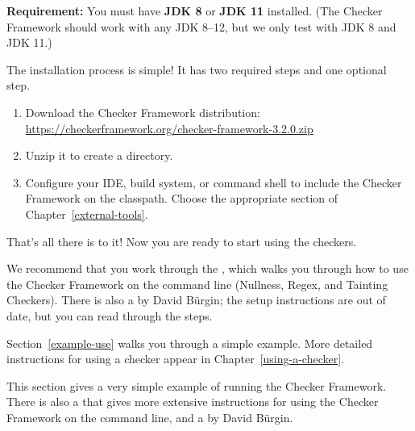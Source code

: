 \textbf{Requirement:}
You must have \textbf{JDK 8} or \textbf{JDK 11} installed.
(The Checker Framework should work with any JDK 8--12, but we only test with JDK 8 and JDK 11.)

The installation process is simple!  It has two required steps and one
optional step.
\begin{enumerate}
\item
  Download the Checker Framework distribution:
  \\
  \url{https://checkerframework.org/checker-framework-3.2.0.zip}

\item
  Unzip it to create a  directory.

\item
  \label{installation-configure-step}%
  Configure your IDE, build system, or command shell to include the Checker
  Framework on the classpath.  Choose the appropriate section of
  Chapter~\ref{external-tools}.


\end{enumerate}

That's all there is to it!  Now you are ready to start using the checkers.

We recommend that you work through the
, which walks you through how to use the Checker
Framework on
the command line (Nullness, Regex, and Tainting Checkers).
There is also a
 by David B\"urgin; the setup instructions are out of date, but
you can read through the steps.

Section~\ref{example-use} walks you through a simple example.  More detailed
instructions for using a checker appear in Chapter~\ref{using-a-checker}.




This section gives a very simple example of running the Checker Framework.
There is also a 
that gives more extensive instructions for using the Checker Framework
on the command line,
and a
 by David B\"urgin.

